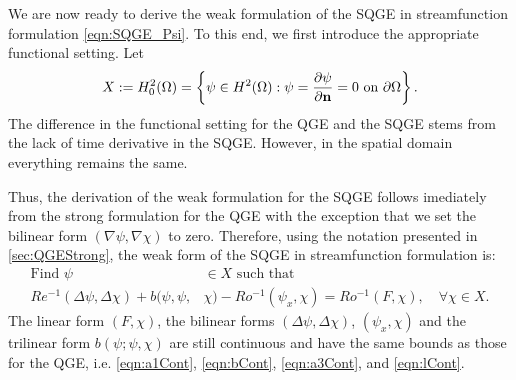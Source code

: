 We are now ready to derive the weak formulation of the SQGE in streamfunction
formulation \eqref{eqn:SQGE_Psi}. To this end, we first introduce the
appropriate functional setting. Let
\begin{equation*}
  X := H^2_0(\Omega) = \left\{ \psi\in H^2(\Omega): \psi=\frac{\partial\psi}{\partial {\bf n}}=0
    \text{ on } \partial\Omega \right\} .
\end{equation*}
The difference in the functional setting for the QGE and the SQGE stems from the
lack of time derivative in the SQGE. However, in the spatial domain everything
remains the same.

Thus, the derivation of the weak formulation for the SQGE follows imediately
from the strong formulation for the QGE with the exception that we set the
bilinear form $(\nabla \psi, \nabla \chi)$ to zero. Therefore, using the
notation presented in \autoref{sec:QGEStrong}, the weak form of the SQGE in streamfunction
formulation is:
\begin{equation}
  \begin{split}
    \text{Find }\psi &\in X \text{ such that} \\
    Re^{-1} (\Delta \psi, \Delta \chi) + b(\psi,\psi,&\chi) - Ro^{-1} (\psi_x,\chi) =
      Ro^{-1} (F,\chi),\quad \forall \chi \in X.  \end{split} \label{eqn:SQGEWF}
\end{equation}
The linear form $(F, \chi)$, the bilinear forms $(\Delta \psi, \Delta \chi)$,
$(\psi_x, \chi)$ and the trilinear form $b(\psi;\psi,\chi)$ are still continuous
\cite{Cayco86} and have the same bounds as those for the QGE, i.e.
\eqref{eqn:a1Cont}, \eqref{eqn:bCont}, \eqref{eqn:a3Cont}, and
\eqref{eqn:lCont}.

